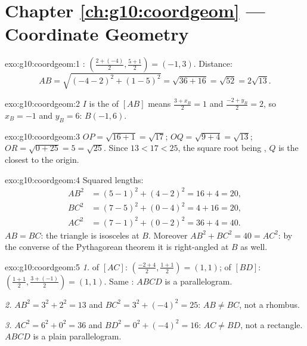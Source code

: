 \section*{Chapter \ref{ch:g10:coordgeom} --- Coordinate Geometry}

\begin{solution}{exo:g10:coordgeom:1}
: $\left(\frac{2 + (-4)}{2}, \frac{5 + 1}{2}\right) = (-1, 3)$.
Distance:
\[
AB = \sqrt{(-4 - 2)^2 + (1 - 5)^2} = \sqrt{36 + 16} = \sqrt{52}
= 2\sqrt{13}.
\]
\end{solution}

\begin{solution}{exo:g10:coordgeom:2}
$I$ is the  of $[AB]$ means $\frac{3 + x_B}{2} = 1$ and
$\frac{-2 + y_B}{2} = 2$, so $x_B = -1$ and $y_B = 6$: $B(-1, 6)$.
\end{solution}

\begin{solution}{exo:g10:coordgeom:3}
$OP = \sqrt{16 + 1} = \sqrt{17}$; $OQ = \sqrt{9 + 4} = \sqrt{13}$;
$OR = \sqrt{0 + 25} = 5 = \sqrt{25}$. Since $13 < 17 < 25$, the square
root being , $Q$ is the closest to the origin.
\end{solution}

\begin{solution}{exo:g10:coordgeom:4}
Squared lengths:
\begin{align*}
AB^2 &= (5-1)^2 + (4-2)^2 = 16 + 4 = 20, \\
BC^2 &= (7-5)^2 + (0-4)^2 = 4 + 16 = 20, \\
AC^2 &= (7-1)^2 + (0-2)^2 = 36 + 4 = 40 .
\end{align*}
$AB = BC$: the triangle is isosceles at $B$. Moreover
$AB^2 + BC^2 = 40 = AC^2$: by the converse of the Pythagorean theorem it
is right-angled at $B$ as well.
\end{solution}

\begin{solution}{exo:g10:coordgeom:5}
\emph{1.}  of $[AC]$:
$\left(\frac{-2+4}{2}, \frac{1+1}{2}\right) = (1, 1)$;  of
$[BD]$: $\left(\frac{1+1}{2}, \frac{3+(-1)}{2}\right) = (1, 1)$. Same
: $ABCD$ is a parallelogram.

\emph{2.} $AB^2 = 3^2 + 2^2 = 13$ and $BC^2 = 3^2 + (-4)^2 = 25$:
$AB \neq BC$, not a rhombus.

\emph{3.} $AC^2 = 6^2 + 0^2 = 36$ and $BD^2 = 0^2 + (-4)^2 = 16$:
$AC \neq BD$, not a rectangle. $ABCD$ is a plain parallelogram.
\end{solution}

